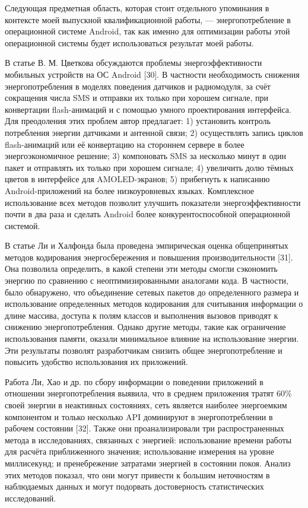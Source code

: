 \documentclass[a4paper,14pt]{extarticle} %
\begin{document}
	Следующая предметная область, которая стоит отдельного упоминания в контексте моей выпускной квалификационной работы, — энергопотребление в операционной системе Android, так как именно для оптимизации работы этой операционной системы будет использоваться результат моей работы.
	
	В статье В. М. Цветкова обсуждаются проблемы энергоэффективности мобильных устройств на ОС Android [30]. В частности необходимость снижения энергопотребления в моделях поведения датчиков и радиомодуля, за счёт сокращения числа SMS и отправки их только при хорошем сигнале, при конвертации flash-анимаций и с помощью умного проектирования интерфейса. Для преодоления этих проблем автор предлагает: 1) установить контроль потребления энергии датчиками и антенной связи; 2) осуществлять запись циклов flash-анимаций или её конвертацию на стороннем сервере в более энергоэкономичное решение; 3) компоновать SMS за несколько минут в один пакет и отправлять их только при хорошем сигнале; 4) увеличить долю тёмных цветов в интерфейсе для AMOLED-экранов; 5) прибегнуть к написанию Android-приложений на более низкоуровневых языках. Комплексное использование всех методов позволит улучшить показатели энергоэффективности почти в два раза и сделать Android более конкурентоспособной операционной системой. 
	
	В статье  Ли и Халфонда была проведена эмпирическая оценка общепринятых методов кодирования энергосбережения и повышения производительности [31]. Она позволила определить, в какой степени эти методы смогли сэкономить энергию по сравнению с неоптимизированными аналогами кода. В частности, было обнаружено, что объединение сетевых пакетов до определенного размера и использование определенных методов кодирования для считывания информации о длине массива, доступа к полям классов и выполнения вызовов приводят к снижению энергопотребления. Однако другие методы, такие как ограничение использования памяти, оказали минимальное влияние на использование энергии. Эти результаты позволят разработчикам снизить общее энергопотребление и повысить удобство использования их приложений.
	
	Работа Ли, Хао и др. по сбору информации о поведении приложений в отношении энергопотребления выявила, что в среднем приложения тратят 60\% своей энергии в неактивных состояниях, сеть является наиболее энергоемким компонентом и только несколько API доминируют в энергопотреблении в рабочем состоянии [32]. Также они проанализировали три распространенных метода в исследованиях, связанных с энергией: использование времени работы для расчёта приближенного значения; использование измерения на уровне миллисекунд; и пренебрежение затратами энергией в состоянии покоя. Анализ этих методов показал, что они могут привести к большим неточностям в наблюдаемых данных и могут подорвать достоверность статистических исследований.
	
\end{document}

